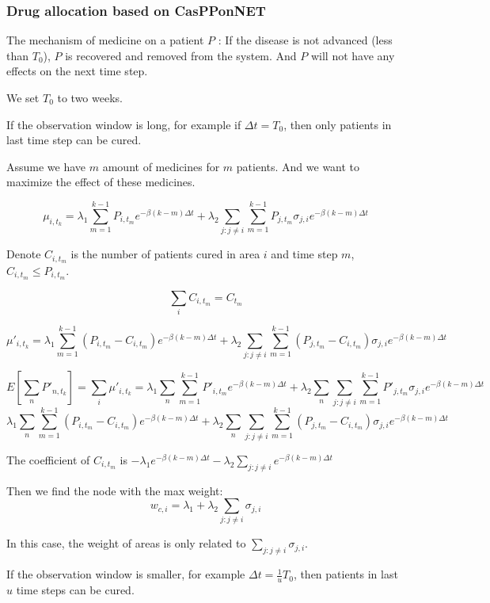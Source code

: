 \documentclass[11pt]{article}
\begin{document}
\label{str}

\subsubsection{Drug allocation based on CasPPonNET}
The mechanism of medicine on a patient $P$ : If the disease is not advanced (less than $T_0$), $P$ is recovered and removed from the system. And $P$ will not have any effects on the next time step.

We set $T_0$ to two weeks. 

If the observation window is long, for example if $\Delta t= T_0$, then only patients in last time step can be cured.

Assume we have $m$ amount of medicines for $m$ patients. And we want to maximize the effect of these medicines.

$$\mu_{i,t_k} = \lambda_1 \sum_{m = 1}^{ k-1} P_{i,t_m} e^{-\beta(k-m)\Delta t} + \lambda_2 \sum_{j:j\neq i} \sum_{m = 1}^{ k-1} P_{j,t_m} \sigma_{j,i} e^{-\beta(k-m)\Delta t}$$

Denote $C_{i,t_m}$ is the number of patients cured in area $i$ and time step $m$, $C_{i,t_m} \leq P_{i,t_m}$.

$$\sum_i C_{i,t_m} = C_{t_m}$$

$$\mu'_{i,t_k} = \lambda_1 \sum_{m = 1}^{ k-1} (P_{i,t_m} - C_{i,t_m}) e^{-\beta(k-m)\Delta t} + \lambda_2 \sum_{j:j\neq i} \sum_{m = 1}^{ k-1} (P_{j,t_m}-C_{i,t_m}) \sigma_{j,i} e^{-\beta(k-m)\Delta t}$$

$$
E[\sum_n {P'_{n,t_k}}] = \sum_i \mu'_{i,t_k} = \lambda_1 \sum_n \sum_{m = 1}^{ k-1} P'_{i,t_m} e^{-\beta(k-m)\Delta t} + \lambda_2 \sum_n \sum_{j:j\neq i} \sum_{m = 1}^{ k-1} P'_{j,t_m} \sigma_{j,i} e^{-\beta(k-m)\Delta t}
$$
$$
\lambda_1 \sum_n \sum_{m = 1}^{ k-1} (P_{i,t_m} - C_{i,t_m}) e^{-\beta(k-m)\Delta t} + \lambda_2 \sum_n \sum_{j:j\neq i} \sum_{m = 1}^{ k-1} (P_{j,t_m} - C_{i,t_m}) \sigma_{j,i} e^{-\beta(k-m)\Delta t}
$$

The coefficient of $C_{i,t_m}$ is $-$$\lambda_1 e^{-\beta(k-m)\Delta t} - \lambda_2 \sum_{j:j\neq i} e^{-\beta(k-m) \Delta t}$



Then we find the node with the max weight:
 $$w_{c,i} = \lambda_1 + \lambda_2 \sum_{j:j\neq i} \sigma_{j,i}$$
 
In this case, the weight of areas is only related to $\sum_{j:j\neq i} \sigma_{j,i}$.


If the observation window is smaller, for example $\Delta t = \frac{1}{u} T_0$, then patients in last $u$ time steps can be cured. 
\end{document}

